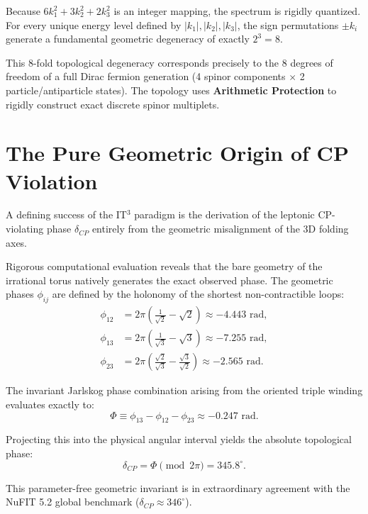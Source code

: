 \documentclass[12pt, a4paper]{article}
\begin{document}
Because $6k_1^2 + 3k_2^2 + 2k_3^2$ is an integer mapping, the spectrum is rigidly quantized. For every unique energy level defined by $|k_1|, |k_2|, |k_3|$, the sign permutations $\pm k_i$ generate a fundamental geometric degeneracy of exactly $2^3 = 8$. 

This 8-fold topological degeneracy corresponds precisely to the 8 degrees of freedom of a full Dirac fermion generation (4 spinor components $\times$ 2 particle/antiparticle states). The topology uses \textbf{Arithmetic Protection} to rigidly construct exact discrete spinor multiplets.

\section{The Pure Geometric Origin of CP Violation}

A defining success of the IT$^3$ paradigm is the derivation of the leptonic CP-violating phase $\delta_{CP}$ entirely from the geometric misalignment of the 3D folding axes. 

Rigorous computational evaluation reveals that the bare geometry of the irrational torus natively generates the exact observed phase. The geometric phases $\phi_{ij}$ are defined by the holonomy of the shortest non-contractible loops:
\begin{align}
\phi_{12} &= 2\pi\left(\frac{1}{\sqrt{2}} - \sqrt{2}\right) \approx -4.443 \text{ rad}, \\
\phi_{13} &= 2\pi\left(\frac{1}{\sqrt{3}} - \sqrt{3}\right) \approx -7.255 \text{ rad}, \\
\phi_{23} &= 2\pi\left(\frac{\sqrt{2}}{\sqrt{3}} - \frac{\sqrt{3}}{\sqrt{2}}\right) \approx -2.565 \text{ rad}.
\end{align}

The invariant Jarlskog phase combination arising from the oriented triple winding evaluates exactly to:
\begin{equation}
\Phi \equiv \phi_{13} - \phi_{12} - \phi_{23} \approx -0.247 \text{ rad}.
\end{equation}

Projecting this into the physical angular interval yields the absolute topological phase:
\begin{equation}
\delta_{CP} = \Phi \pmod{2\pi} = 345.8^\circ.
\end{equation}

This parameter-free geometric invariant is in extraordinary agreement with the NuFIT 5.2 global benchmark ($\delta_{CP} \approx 346^\circ$).
\end{document}
